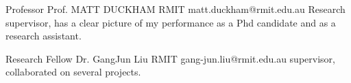 \begin{cventries}
\cventry
{Professor}
{Prof. MATT DUCKHAM}
{RMIT}
{matt.duckham@rmit.edu.au}
{Research supervisor, has a clear picture of my performance as a Phd candidate and as a research assistant.}

\cventry
{Research Fellow}
{Dr. GangJun Liu}
{RMIT}
{gang-jun.liu@rmit.edu.au}
{supervisor, collaborated on several projects.}
\end{cventries}